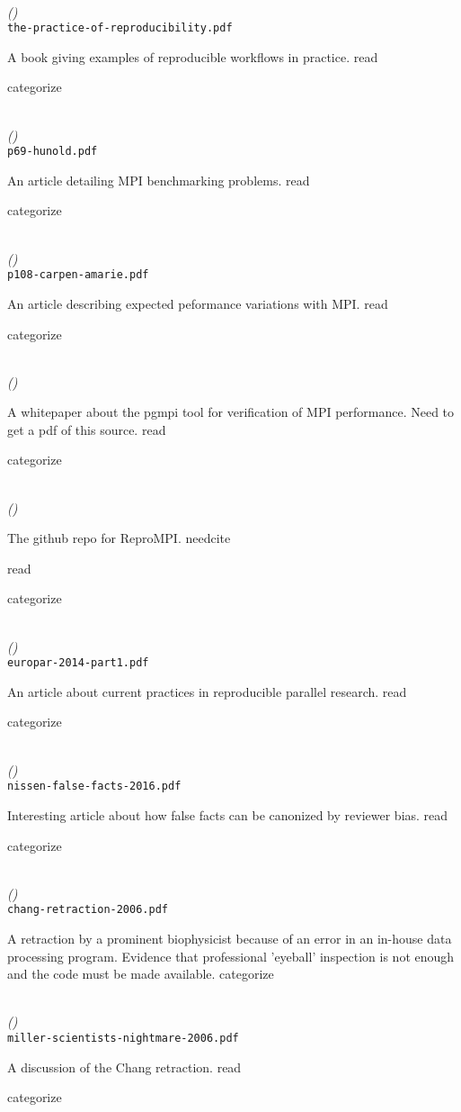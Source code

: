 \documentclass[american]{article}
\newcommand{\Read}{
	\gls{read}
}
\newcommand{\categorize}{
	\gls{categorize}
}
\newcommand{\needcite}{
	\gls{needcite}
}
\newenvironment{refdef}[2] {
	\noindent \textbf{\citetitle{#1}} \cite{#1}\\ \citejournalorbooktitle{#1} \textit{(\citeyear{#1})}\\ \texttt{#2} \vspace{0.2in} \par 
} {
\vspace{0.2in}
}
\begin{document}
\begin{refdef}{rokem-repro-human-mri}{the-practice-of-reproducibility.pdf}
A book giving examples of reproducible workflows in practice. \Read \categorize
\end{refdef}

\begin{refdef}{hunold-repro-mpi-benchmarking-2014}{p69-hunold.pdf}
An article detailing MPI benchmarking problems. \Read \categorize
\end{refdef}

\begin{refdef}{carpen-amarie-mpi-performance-2016}{p108-carpen-amarie.pdf}
An article describing expected peformance variations with MPI. \Read \categorize
\end{refdef}

\begin{refdef}{pgmpi}{}
A whitepaper about the pgmpi tool for verification of MPI performance. Need to get a pdf of this source. \Read \categorize
\end{refdef}

\begin{refdef}{reprompi}{}
The github repo for ReproMPI. \needcite \Read \categorize
\end{refdef}

\begin{refdef}{Carpen-Amarie-repro-research-2014}{europar-2014-part1.pdf}
An article about current practices in reproducible parallel research. \Read \categorize
\end{refdef}

\begin{refdef}{nissen-false-facts-2016}{nissen-false-facts-2016.pdf}
Interesting article about how false facts can be canonized by reviewer bias. \Read \categorize
\end{refdef}

\begin{refdef}{chang-retraction-2006}{chang-retraction-2006.pdf}
A retraction by a prominent biophysicist because of an error in an in-house data processing program. Evidence that professional 'eyeball' inspection is not enough and the code must be made available. \categorize
\end{refdef}

\begin{refdef}{miller-scientists-nightmare-2006}{miller-scientists-nightmare-2006.pdf}
A discussion of the Chang retraction. \Read \categorize
\end{refdef}
\end{document}
